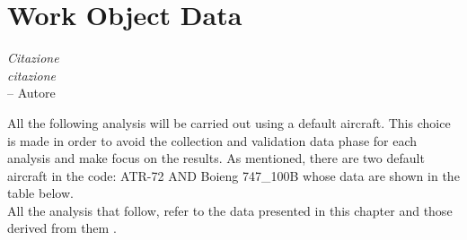 \chapter{Work Object Data}
\label{ch:workobject}

\begin{flushright}
	{\smaller
		\textit{Citazione\\ citazione}\\
		-- Autore}
\end{flushright}

All the following analysis will be carried out using a default aircraft. This choice is made in order to avoid the collection and validation data phase for each analysis and make focus on the results. As mentioned, there are two default aircraft in the code: ATR-72 AND Boieng 747\_100B whose data are shown in the table below.\\
All the analysis that follow, refer to the data presented in this chapter and those derived from them .

